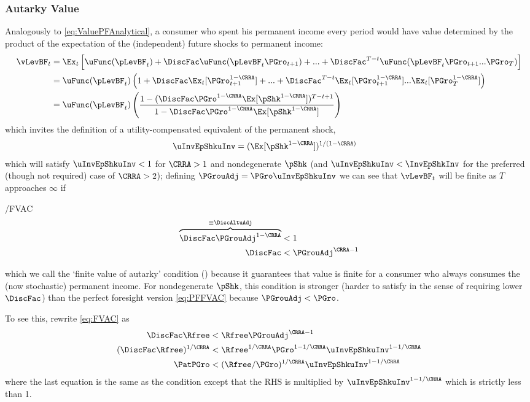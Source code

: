\documentclass[BufferStockTheory]{subfiles}
\begin{document}
\subsubsection{Autarky Value}
Analogously to \eqref{eq:ValuePFAnalytical}, a consumer who spent his permanent income every period would have value determined by the product of the expectation of the (independent) future shocks to permanent income:
\begin{align*}
  \vLevBF_{t}  & = \Ex_{t}\left[\uFunc(\pLevBF_{t}) + \DiscFac \uFunc(\pLevBF_{t}\PGro_{t+1}) + ... + \DiscFac^{T-t}\uFunc(\pLevBF_{t}\PGro_{t+1}...\PGro_{T})\right] \\
               & = \uFunc(\pLevBF_{t})\left(1+ \DiscFac \Ex_{t}[\PGro_{t+1}^{1-\CRRA}] +  ... + \DiscFac^{T-t}\Ex_{t}[\PGro_{t+1}^{1-\CRRA}]...\Ex_{t}[\PGro_{T}^{1-\CRRA}]\right) \\
               & = \uFunc(\pLevBF_{t})\left(\frac{1-(\DiscFac \PGro^{1-\CRRA}\Ex[\pShk^{1-\CRRA}])^{T-t+1}}{1-\DiscFac \PGro^{1-\CRRA} \Ex[\pShk^{1-\CRRA}]}\right)
\end{align*}
which invites the definition of a utility-compensated equivalent of the permanent shock,
\begin{align*}
  \uInvEpShkuInv  & = (\Ex[\pShk^{1-\CRRA}])^{1/(1-\CRRA)}
\end{align*}
which will satisfy $\uInvEpShkuInv < 1$ for $\CRRA>1$ and nondegenerate $\pShk$ (and $\uInvEpShkuInv < \InvEpShkInv$ for the preferred (though not required) case of $\CRRA > 2$); defining $\PGrouAdj=\PGro \uInvEpShkuInv$ we can see that $\vLevBF_{t}$ will be finite as $T$ approaches $\infty$ if


\hypertarget{FVAC}{}
\begin{verbatimwrite}{\EqDir/FVAC}
  \begin{align}
    \overbrace{\DiscFac \PGrouAdj^{1-\CRRA} }^{\equiv \DiscAltuAdj}  & < 1 \label{eq:FVAC}
    \\ \DiscFac  & < \PGrouAdj^{\CRRA-1} \notag
  \end{align}
\end{verbatimwrite}
 which we call the `finite value of autarky'
condition (\FVAC) because it guarantees that value is finite for a consumer who always consumes the 
(now stochastic) permanent income.  For nondegenerate $\pShk$, this 
condition is stronger
(harder to satisfy in the sense of requiring lower $\DiscFac$) than
the perfect foresight version \eqref{eq:PFFVAC} because $\PGrouAdj <
\PGro$.  

To see this, rewrite \eqref{eq:FVAC} as 
\begin{align*}
  \DiscFac \Rfree & < \Rfree \PGrouAdj^{\CRRA-1}
  \\ (\DiscFac \Rfree)^{1/\CRRA}  & < \Rfree^{1/\CRRA} \PGro^{1-1/\CRRA} \uInvEpShkuInv^{1-1/\CRRA}
  \\ \PatPGro & < (\Rfree/\PGro)^{1/\CRRA} \uInvEpShkuInv^{1-1/\CRRA}
\end{align*}
where the last equation is the same as the {\PFFVAC} condition except that the 
RHS is multiplied by $\uInvEpShkuInv^{1-1/\CRRA}$ which is strictly less than 1.
\end{document}
